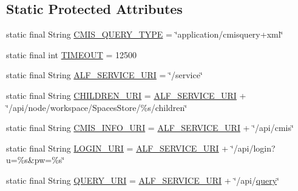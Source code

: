\subsection*{Static Protected Attributes}
\begin{DoxyCompactItemize}
\item 
static final String \hyperlink{classcom_1_1zia_1_1freshdocs_1_1cmis_1_1_c_m_i_s_a8ccc4f8fe5bcf4a9b72869c479814923}{C\-M\-I\-S\-\_\-\-Q\-U\-E\-R\-Y\-\_\-\-T\-Y\-P\-E} = \char`\"{}application/cmisquery+xml\char`\"{}
\item 
static final int \hyperlink{classcom_1_1zia_1_1freshdocs_1_1cmis_1_1_c_m_i_s_af72dbee69e05863262c0f59b122c5498}{T\-I\-M\-E\-O\-U\-T} = 12500
\item 
static final String \hyperlink{classcom_1_1zia_1_1freshdocs_1_1cmis_1_1_c_m_i_s_a3ed64fb0006fa1ccc6c135041ab95db5}{A\-L\-F\-\_\-\-S\-E\-R\-V\-I\-C\-E\-\_\-\-U\-R\-I} = \char`\"{}/service\char`\"{}
\item 
static final String \hyperlink{classcom_1_1zia_1_1freshdocs_1_1cmis_1_1_c_m_i_s_aea775cfea9e3305e7ce475e03bd69358}{C\-H\-I\-L\-D\-R\-E\-N\-\_\-\-U\-R\-I} = \hyperlink{classcom_1_1zia_1_1freshdocs_1_1cmis_1_1_c_m_i_s_a3ed64fb0006fa1ccc6c135041ab95db5}{A\-L\-F\-\_\-\-S\-E\-R\-V\-I\-C\-E\-\_\-\-U\-R\-I} + \char`\"{}/api/node/workspace/Spaces\-Store/\%s/children\char`\"{}
\item 
static final String \hyperlink{classcom_1_1zia_1_1freshdocs_1_1cmis_1_1_c_m_i_s_a7aa441bd8e6b3fdab720633f5f8672c4}{C\-M\-I\-S\-\_\-\-I\-N\-F\-O\-\_\-\-U\-R\-I} = \hyperlink{classcom_1_1zia_1_1freshdocs_1_1cmis_1_1_c_m_i_s_a3ed64fb0006fa1ccc6c135041ab95db5}{A\-L\-F\-\_\-\-S\-E\-R\-V\-I\-C\-E\-\_\-\-U\-R\-I} + \char`\"{}/api/cmis\char`\"{}
\item 
static final String \hyperlink{classcom_1_1zia_1_1freshdocs_1_1cmis_1_1_c_m_i_s_a5d4e0ecadb771d666fe1423e9617636f}{L\-O\-G\-I\-N\-\_\-\-U\-R\-I} = \hyperlink{classcom_1_1zia_1_1freshdocs_1_1cmis_1_1_c_m_i_s_a3ed64fb0006fa1ccc6c135041ab95db5}{A\-L\-F\-\_\-\-S\-E\-R\-V\-I\-C\-E\-\_\-\-U\-R\-I} + \char`\"{}/api/login?u=\%s\&pw=\%s\char`\"{}
\item 
static final String \hyperlink{classcom_1_1zia_1_1freshdocs_1_1cmis_1_1_c_m_i_s_acff46293605a68929d326ba50beebec9}{Q\-U\-E\-R\-Y\-\_\-\-U\-R\-I} = \hyperlink{classcom_1_1zia_1_1freshdocs_1_1cmis_1_1_c_m_i_s_a3ed64fb0006fa1ccc6c135041ab95db5}{A\-L\-F\-\_\-\-S\-E\-R\-V\-I\-C\-E\-\_\-\-U\-R\-I} + \char`\"{}/api/\hyperlink{classcom_1_1zia_1_1freshdocs_1_1cmis_1_1_c_m_i_s_a44d1b5f259bf1aef975fef2b11eaee87}{query}\char`\"{}

\end{DoxyCompactItemize}
